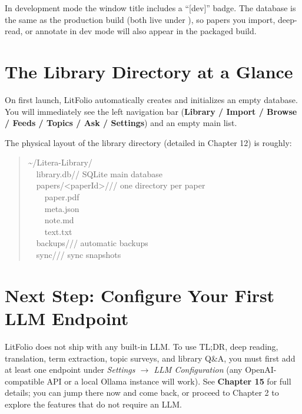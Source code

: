 \begin{tipbox}
In development mode the window title includes a ``[dev]'' badge. The database is
the same as the production build (both live under ),
so papers you import, deep-read, or annotate in dev mode will also appear in the
packaged build.
\end{tipbox}

\section{The Library Directory at a Glance}

On first launch, LitFolio automatically creates 
and initializes an empty database. You will immediately see the left navigation bar
(\textbf{Library / Import / Browse / Feeds / Topics / Ask / Settings}) and an empty
main list.


The physical layout of the library directory (detailed in Chapter 12) is roughly:

\begin{quote}\small\ttfamily
\textasciitilde/Litera-Library/\\
\ \ library.db\hfill\textnormal{\small // SQLite main database}\\
\ \ papers/<paperId>/\hfill\textnormal{\small // one directory per paper}\\
\ \ \ \ paper.pdf\\
\ \ \ \ meta.json\\
\ \ \ \ note.md\\
\ \ \ \ text.txt\\
\ \ backups/\hfill\textnormal{\small // automatic backups}\\
\ \ sync/\hfill\textnormal{\small // sync snapshots}
\end{quote}

\section{Next Step: Configure Your First LLM Endpoint}

LitFolio does not ship with any built-in LLM. To use TL;DR, deep reading, translation,
term extraction, topic surveys, and library Q\&A, you must first add at least one
endpoint under \emph{Settings $\to$ LLM Configuration} (any OpenAI-compatible API
or a local Ollama instance will work). See \textbf{Chapter 15} for full details;
you can jump there now and come back, or proceed to Chapter 2 to explore the
features that do not require an LLM.

